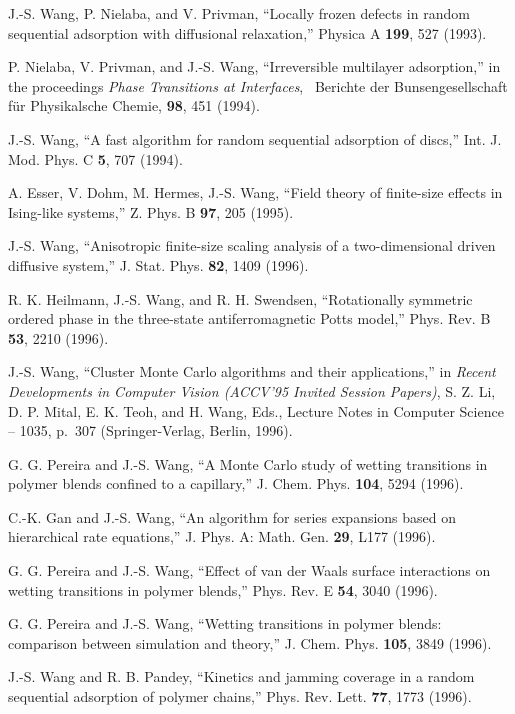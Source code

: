 \itm J.-S. Wang, P. Nielaba, and V. Privman, 
  ``Locally frozen defects in random sequential
  adsorption with diffusional relaxation,'' 
  Physica A {\bf 199}, 527 (1993). 

\itm P. Nielaba, V. Privman, and J.-S. Wang, ``Irreversible multilayer
  adsorption,'' in the proceedings {\it Phase Transitions at Interfaces},
  \ Berichte der Bunsengesellschaft f\"ur Physikalsche Chemie,
  {\bf 98}, 451 (1994). 

\itm J.-S. Wang, ``A fast algorithm for random sequential adsorption
  of discs,'' Int. J. Mod. Phys. C {\bf 5}, 707 (1994).

\itm A. Esser, V. Dohm, M. Hermes, J.-S. Wang, ``Field theory of
  finite-size effects in Ising-like systems,'' Z. Phys. B {\bf 97}, 205 (1995).

\itm J.-S. Wang, ``Anisotropic finite-size scaling analysis of a 
  two-dimensional driven diffusive system,'' 
  J. Stat. Phys. {\bf 82}, 1409 (1996).

\itm R. K. Heilmann, J.-S. Wang, and R. H. Swendsen, ``Rotationally symmetric
  ordered phase in the three-state antiferromagnetic Potts model,'' 
  Phys. Rev. B {\bf 53}, 2210 (1996).

\itm J.-S. Wang, ``Cluster Monte Carlo algorithms and their applications,''
  in  {\it Recent Developments in Computer Vision (ACCV'95 Invited Session
  Papers)}, S. Z. Li, D. P. Mital, E. K. Teoh, and H. Wang, Eds., 
  Lecture Notes in Computer Science -- 1035, p.~307 (Springer-Verlag, 
  Berlin, 1996).

\itm G. G. Pereira and J.-S. Wang, ``A Monte Carlo study of wetting 
  transitions in polymer blends confined to a capillary,'' J. Chem. Phys. 
  {\bf 104}, 5294 (1996).

\itm C.-K. Gan and J.-S. Wang, ``An algorithm for series expansions based
  on hierarchical rate equations,'' J. Phys. A: Math. Gen. 
  {\bf 29}, L177 (1996).

\itm G. G. Pereira and J.-S. Wang, ``Effect of van der Waals surface
  interactions on wetting transitions in polymer blends,'' 
  Phys. Rev. E {\bf 54}, 3040 (1996).

\itm G. G. Pereira and J.-S. Wang, ``Wetting transitions in polymer blends:
  comparison between simulation and theory,''  J. Chem. Phys. {\bf 105}, 
  3849 (1996).

\itm J.-S. Wang and R. B. Pandey, ``Kinetics and jamming coverage in a
  random sequential adsorption of polymer chains,''  Phys. Rev. Lett.
  {\bf 77}, 1773 (1996).

